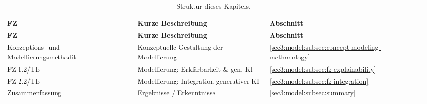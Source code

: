 {
    \def\arraystretch{1.1}%
    \begin{xltabular}{\linewidth}{
            @{}
            >{
                \linewidth
                \raggedright\arraybackslash
            }X
            >{
                \linewidth
                \raggedright\arraybackslash
            }X
            >{
                \linewidth
                \centering\arraybackslash
            }X
            @{}
    }


    \caption{Struktur dieses Kapitels.}
    \label{sec3:model:table:structure} \\

    \toprule

    \textbf{FZ} & \textbf{Kurze Beschreibung} & \textbf{Abschnitt} \\

    \midrule

    \endfirsthead


    \toprule

    \textbf{FZ} & \textbf{Kurze Beschreibung} & \textbf{Abschnitt} \\

    \midrule

    \endhead


    Konzeptions- und Modellierungsmethodik & Konzeptuelle Gestaltung der Modellierung & \cref{sec3:model:subsec:concept-modeling-methodology} \\
    FZ 1.2/TB & Modellierung: Erklärbarkeit \& gen. KI & \cref{sec3:model:subsec:fz-explainability} \\
    FZ 2.2/TB & Modellierung: Integration generativer KI & \cref{sec3:model:subsec:fz-integration} \\
    Zusammenfassung & Ergebnisse / Erkenntnisse & \cref{sec3:model:subsec:summary} \\

    \bottomrule

    \end{xltabular}
}
